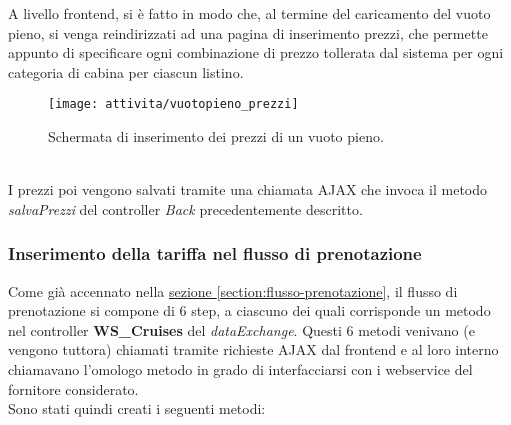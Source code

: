 A livello frontend, si è fatto in modo che, al termine del caricamento del vuoto pieno, si venga reindirizzati ad una pagina di inserimento prezzi, che permette appunto di specificare ogni combinazione di prezzo tollerata dal sistema per ogni categoria di cabina per ciascun listino. 
	\begin{figure}[!h] 
	\centering 
	\texttt{[image: attivita/vuotopieno\_prezzi]} 
	\caption{Schermata di inserimento dei prezzi di un vuoto pieno.}
\end{figure}\\
I prezzi poi vengono salvati tramite una chiamata AJAX che invoca il metodo \textit{salvaPrezzi} del controller \textit{Back} precedentemente descritto.

\subsubsection{Inserimento della tariffa nel flusso di prenotazione}
Come già accennato nella \hyperref[section:flusso-prenotazione]{sezione \ref*{section:flusso-prenotazione}}, il flusso di prenotazione si compone di 6 step, a ciascuno dei quali corrisponde un metodo nel controller \textbf{WS\_Cruises} del \textit{dataExchange}. Questi 6 metodi venivano (e vengono tuttora) chiamati tramite richieste AJAX dal frontend e al loro interno chiamavano l'omologo metodo in grado di interfacciarsi con i \gls{webservice} del fornitore considerato.\\
Sono stati quindi creati i seguenti metodi:
